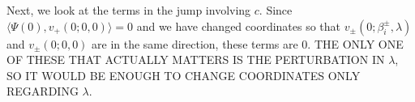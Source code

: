 \documentclass[12pt]{article}
\newtheorem{lemma}{Lemma}
\begin{document}
Next, we look at the terms in the jump involving $c$. Since $\langle \Psi(0), v_+(0; 0, 0) \rangle = 0$ and we have changed coordinates so that $v_\pm(0; \beta_i^\pm, \lambda)$ and $v_\pm(0; 0, 0)$ are in the same direction, these terms are 0. THE ONLY ONE OF THESE THAT ACTUALLY MATTERS IS THE PERTURBATION IN $\lambda$, SO IT WOULD BE ENOUGH TO CHANGE COORDINATES ONLY REGARDING $\lambda$.







\end{document}
